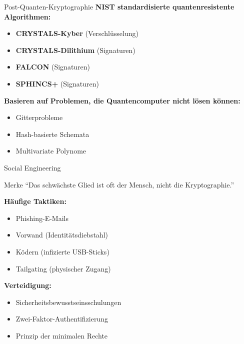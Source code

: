 \documentclass[handout]{beamer}
\begin{document}
\begin{frame}{Post-Quanten-Kryptographie}
\textbf{NIST standardisierte quantenresistente Algorithmen:}

\vspace{0.3cm}
\begin{itemize}
    \item \textbf{CRYSTALS-Kyber} (Verschlüsselung)
    \item \textbf{CRYSTALS-Dilithium} (Signaturen)
    \item \textbf{FALCON} (Signaturen)
    \item \textbf{SPHINCS+} (Signaturen)
\end{itemize}

\vspace{0.3cm}
\textbf{Basieren auf Problemen, die Quantencomputer nicht lösen können:}
\begin{itemize}
    \item Gitterprobleme
    \item Hash-basierte Schemata
    \item Multivariate Polynome
\end{itemize}
\end{frame}

\begin{frame}{Social Engineering}
\begin{alertblock}{Merke}
``Das schwächste Glied ist oft der Mensch, nicht die Kryptographie.''
\end{alertblock}

\vspace{0.3cm}
\textbf{Häufige Taktiken:}
\begin{itemize}
    \item Phishing-E-Mails
    \item Vorwand (Identitätsdiebstahl)
    \item Ködern (infizierte USB-Sticks)
    \item Tailgating (physischer Zugang)
\end{itemize}

\vspace{0.3cm}
\textbf{Verteidigung:}
\begin{itemize}
    \item Sicherheitsbewusstseinsschulungen
    \item Zwei-Faktor-Authentifizierung
    \item Prinzip der minimalen Rechte
\end{itemize}

\end{frame}
\end{document}
